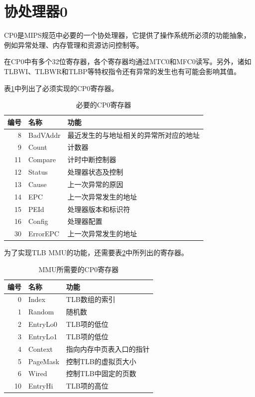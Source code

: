 \section{协处理器0}
CP0是MIPS规范中必要的一个协处理器，它提供了操作系统所必须的功能抽象，例如异常处理、内存管理和资源访问控制等。

在CP0中有多个32位寄存器，各个寄存器均通过MTC0和MFC0读写。另外，诸如TLBWI、TLBWR和TLBP等特权指令还有异常的发生也有可能会影响其值。

表\ref{table:required_cp0_registers}中列出了必须实现的CP0寄存器。

\begin{table}[!htbp]
    \centering
    \begin{tabular}{|r|l|l|}
    \hline
    \textbf{编号} & \textbf{名称} & \textbf{功能}  \\ \hline
	8 & BadVAddr & 最近发生的与地址相关的异常所对应的地址 \\ \hline
	9 & Count & 计数器 \\ \hline
	11 & Compare & 计时中断控制器 \\ \hline
	12 & Status & 处理器状态及控制 \\ \hline
	13 & Cause & 上一次异常的原因 \\ \hline
	14 & EPC & 上一次异常发生的地址 \\ \hline
	15 & PEId & 处理器版本和标识符 \\ \hline
	16 & Config & 处理器配置 \\ \hline
	30 & ErrorEPC & 上一次异常发生的地址 \\ \hline
    \end{tabular}
    \caption{必要的CP0寄存器}
    \label{table:required_cp0_registers}
\end{table}

为了实现TLB MMU的功能，还需要表\ref{table:mmu_cp0_registers}中所列出的寄存器。

\begin{table}[!htbp]
    \centering
    \begin{tabular}{|r|l|l|}
    \hline
    \textbf{编号} & \textbf{名称} & \textbf{功能}  \\ \hline
	0 & Index & TLB数组的索引 \\ \hline
	1 & Random & 随机数 \\ \hline
	2 & EntryLo0 & TLB项的低位 \\ \hline
	3 & EntryLo1 & TLB项的低位 \\ \hline
	4 & Context & 指向内存中页表入口的指针 \\ \hline
	5 & PageMask & 控制TLB的虚拟页大小 \\ \hline
	6 & Wired & 控制TLB中固定的页数 \\ \hline
	10 & EntryHi & TLB项的高位 \\ \hline
    \end{tabular}
    \caption{MMU所需要的CP0寄存器}
    \label{table:mmu_cp0_registers}
\end{table}

